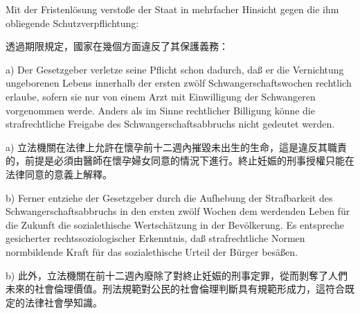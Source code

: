 \documentclass[12pt]{article}
\begin{document}
\syncleft
\begin{sourcepara}
Mit der Fristenlösung verstoße der Staat in mehrfacher Hinsicht gegen die ihm obliegende Schutzverpflichtung:
\end{sourcepara}
\begin{transpara}
透過期限規定，國家在幾個方面違反了其保護義務：
\end{transpara}

\syncleft
\begin{sourcepara}
a) Der Gesetzgeber verletze seine Pflicht schon dadurch, daß er die Vernichtung ungeborenen Lebens innerhalb der ersten zwölf Schwangerschaftswochen rechtlich erlaube, sofern sie nur von einem Arzt mit Einwilligung der Schwangeren vorgenommen werde. Anders als im Sinne rechtlicher Billigung könne die strafrechtliche Freigabe des Schwangerschaftsabbruchs nicht gedeutet werden.
\end{sourcepara}
\begin{transpara}
a) 立法機關在法律上允許在懷孕前十二週內摧毀未出生的生命，這是違反其職責的，前提是必須由醫師在懷孕婦女同意的情況下進行。終止妊娠的刑事授權只能在法律同意的意義上解釋。
\end{transpara}

\syncleft
\begin{sourcepara}
b) Ferner entziehe der Gesetzgeber durch die Aufhebung der Strafbarkeit des Schwangerschaftsabbruchs in den ersten zwölf Wochen dem werdenden Leben für die Zukunft die sozialethische Wertschätzung in der Bevölkerung. Es entspreche gesicherter rechtssoziologischer Erkenntnis, daß strafrechtliche Normen normbildende Kraft für das sozialethische Urteil der Bürger besäßen.
\end{sourcepara}
\begin{transpara}
b) 此外，立法機關在前十二週內廢除了對終止妊娠的刑事定罪，從而剝奪了人們未來的社會倫理價值。刑法規範對公民的社會倫理判斷具有規範形成力，這符合既定的法律社會學知識。
\end{transpara}
\end{document}
